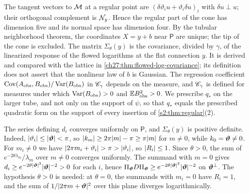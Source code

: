 The tangent vectors to $\mathcal M$ at a regular point are $(\delta\vartheta_iu+\vartheta_i\delta u)_i$ with $\delta u\perp u$; their orthogonal complement is $\mathcal N_{y}$. Hence the regular part of the cone has dimension five and its normal space has dimension four. By the tubular neighborhood theorem, the coordinates $X=y+b$ near $\mathsf P$ are unique; the tip of the cone is excluded. The matrix $\Sigma_\theta(y)$ is the covariance, divided by $\gamma$, of the linearized response of the flowed logarithms at the flat connection $y$. It is derived and compared with the lattice in \cref{ch27:thm:flowed-log-covariance}; its definition does not assert that the nonlinear law of $b$ is Gaussian. The regression coefficient $\operatorname{Cov}(A_{\mathrm{obs}},B_{\mathrm{obs}})/\operatorname{Var}(B_{\mathrm{obs}})$ in $\mathscr C_\gamma$ depends on the measure, and $\mathscr C_\gamma$ is defined for measures under which $\operatorname{Var}(B_{\mathrm{obs}})>0$ and $\mathbb EB_{\mathrm{obs}}^2>0$. We prescribe $q_*$ on the larger tube, and not only on the support of $\psi$, so that $q_*$ equals the prescribed quadratic form on the support of every insertion of \cref{s2:thm:regular}(2).

\begin{remark}\label{ch01:rem:covariance-positive}
The series defining $d_i$ converges uniformly on $\mathsf P$, and $\Sigma_\theta(y)$ is positive definite. Indeed, $\lvert \vartheta_i\rvert\le\lvert \bm\vartheta\rvert<\pi$, so $\lvert k_m\rvert\ge2\pi\lvert m\rvert-\pi\ge\pi\lvert m\rvert$ for $m\ne0$, while $k_0=\bm\vartheta\ne0$. For $m_i\ne0$ we have $\lvert 2\pi m_i+\vartheta_i\rvert>\pi>\lvert \vartheta_i\rvert$, so $\lvert R_i\rvert\le1$. Since $\theta>0$, the sum of $e^{-2\theta\lambda_m}/\lambda_m$ over $m\ne0$ converges uniformly. The summand with $m=0$ gives $d_i\ge e^{-2\theta\lvert \bm\vartheta\rvert^2}\lvert \bm\vartheta\rvert^{-2}>0$ for each $i$, hence $\Pi_{\bm\vartheta}D\Pi_{\bm\vartheta}\ge e^{-2\theta\lvert \bm\vartheta\rvert^2}\lvert \bm\vartheta\rvert^{-2}$ on $\bm\vartheta^\perp$. The hypothesis $\theta>0$ is needed: at $\theta=0$, the summands with $m_i=0$ have $R_i=1$, and the sum of $1/\lvert 2\pi m+\bm\vartheta\rvert^2$ over this plane diverges logarithmically.
\end{remark}

